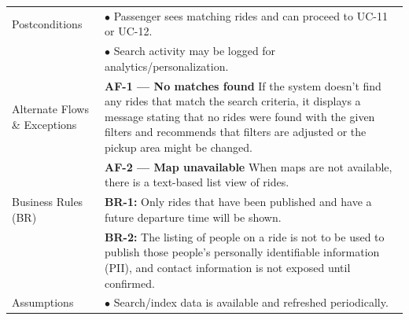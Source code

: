 \begin{longtable}{|>{\raggedright\arraybackslash}p{4cm}|>{\raggedright\arraybackslash}p{11cm}|}
\hline
Postconditions & $\bullet$ Passenger sees matching rides and can proceed to UC-11 or UC-12. \\
& $\bullet$ Search activity may be logged for analytics/personalization. \\
\hline
Alternate Flows \& Exceptions & \textbf{AF-1 — No matches found} \newline If the system doesn't find any rides that match the search criteria, it displays a message stating that no rides were found with the given filters and recommends that filters are adjusted or the pickup area might be changed. \\
& \textbf{AF-2 — Map unavailable} \newline When maps are not available, there is a text-based list view of rides. \\
\hline
Business Rules (BR) & \textbf{BR-1:} Only rides that have been published and have a future departure time will be shown. \\
& \textbf{BR-2:} The listing of people on a ride is not to be used to publish those people's personally identifiable information (PII), and contact information is not exposed until confirmed. \\
\hline
Assumptions & $\bullet$ Search/index data is available and refreshed periodically. \\
\end{longtable}

